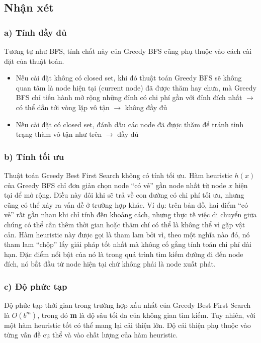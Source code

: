 \subsection{Nhận xét}
\subsubsection{a) Tính đầy đủ}
\hspace{0.42cm} Tương tự như BFS, tính chất này của Greedy BFS cũng phụ thuộc vào cách cài đặt của thuật toán. 
\begin{itemize}
    \item Nếu cài đặt không có closed set, khi đó thuật toán Greedy BFS sẽ không quan tâm là node hiện tại (current node) đã được thăm hay chưa, mà Greedy BFS chỉ tiến hành mở rộng những đỉnh có chi phí gần với đỉnh đích nhất $\rightarrow$ có thể dẫn tới vòng lặp vô tận $\rightarrow$ không đầy đủ
    \item Nếu cài đặt có closed set, đánh dấu các node đã được thăm để tránh tình trạng thăm vô tận như trên $\rightarrow$ đầy đủ
\end{itemize}
\subsubsection{b) Tính tối ưu}
\hspace{0.42cm} Thuật toán Greedy Best First Search không có tính tối ưu. Hàm heuristic $h(x)$ của Greedy BFS chỉ đơn giản chọn node “có vẻ” gần node nhất từ node $x$ hiện tại để mở rộng. Điều này đôi khi sẽ trả về con đường có chi phí tối ưu, nhưng cũng có thể xảy ra vấn đề ở trường hợp khác. Ví dụ: trên bản đồ, hai điểm “có vẻ” rất gần nhau khi chỉ tính đến khoảng cách, nhưng thực tế việc di chuyển giữa chúng có thể cần thêm thời gian hoặc thậm chí có thể là không thể vì gặp vật cản. Hàm heuristic này được gọi là tham lam bởi vì, theo một nghĩa nào đó, nó tham lam “chộp” lấy giải pháp tốt nhất mà không cố gắng tính toán chi phí dài hạn. Đặc điểm nổi bật của nó là trong quá trình tìm kiếm đường đi đến node đích, nó bắt đầu từ node hiện tại chứ không phải là node xuất phát.
\subsubsection{c) Độ phức tạp}
\hspace{0.42cm} Độ phức tạp thời gian trong trường hợp xấu nhất của Greedy Best First Search là $O(b^m)$, trong đó \textbf{m} là độ sâu tối đa của không gian tìm kiếm. Tuy nhiên, với một hàm heuristic tốt có thể mang lại cải thiện lớn. Độ cải thiện phụ thuộc vào từng vấn đề cụ thể và vào chất lượng của hàm heuristic. 

